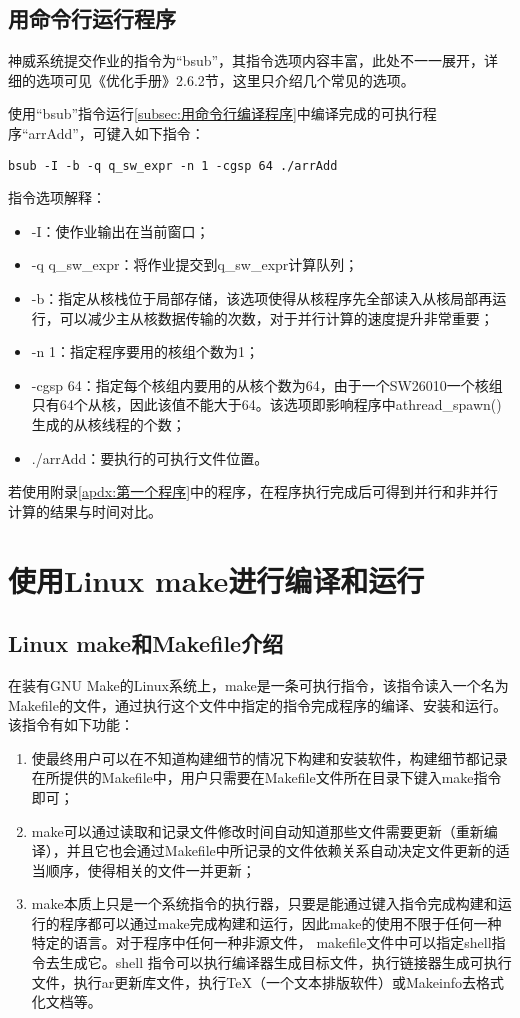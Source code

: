 \subsection{用命令行运行程序}
神威系统提交作业的指令为“bsub”，其指令选项内容丰富，此处不一一展开，详细的选项可见《优化手册》2.6.2节，这里只介绍几个常见的选项。

使用“bsub”指令运行\ref{subsec:用命令行编译程序}中编译完成的可执行程序“arrAdd”，可键入如下指令：
\begin{lstlisting}
bsub -I -b -q q_sw_expr -n 1 -cgsp 64 ./arrAdd
\end{lstlisting}
指令选项解释：
\begin{itemize}
  \item -I：使作业输出在当前窗口；
  \item -q q\_sw\_expr：将作业提交到q\_sw\_expr计算队列；
  \item -b：指定从核栈位于局部存储，该选项使得从核程序先全部读入从核局部再运行，可以减少主从核数据传输的次数，对于并行计算的速度提升非常重要；
  \item -n 1：指定程序要用的核组个数为1；
  \item -cgsp 64：指定每个核组内要用的从核个数为64，由于一个SW26010一个核组只有64个从核，因此该值不能大于64。该选项即影响程序中athread\_spawn()生成的从核线程的个数；
  \item ./arrAdd：要执行的可执行文件位置。
\end{itemize}

若使用附录\ref{apdx:第一个程序}中的程序，在程序执行完成后可得到并行和非并行计算的结果与时间对比。

\section{使用Linux make进行编译和运行}
\subsection{Linux make和Makefile介绍}
在装有GNU Make的Linux系统上，make是一条可执行指令，该指令读入一个名为Makefile的文件，通过执行这个文件中指定的指令完成程序的编译、安装和运行。该指令有如下功能：
\begin{enumerate}
  \item 使最终用户可以在不知道构建细节的情况下构建和安装软件，构建细节都记录在所提供的Makefile中，用户只需要在Makefile文件所在目录下键入make指令即可；
  \item make可以通过读取和记录文件修改时间自动知道那些文件需要更新（重新编译），并且它也会通过Makefile中所记录的文件依赖关系自动决定文件更新的适当顺序，使得相关的文件一并更新；
  \item make本质上只是一个系统指令的执行器，只要是能通过键入指令完成构建和运行的程序都可以通过make完成构建和运行，因此make的使用不限于任何一种特定的语言。对于程序中任何一种非源文件， makefile文件中可以指定shell指令去生成它。shell 指令可以执行编译器生成目标文件，执行链接器生成可执行文件，执行ar更新库文件，执行TeX（一个文本排版软件）或Makeinfo去格式化文档等。
\end{enumerate}
